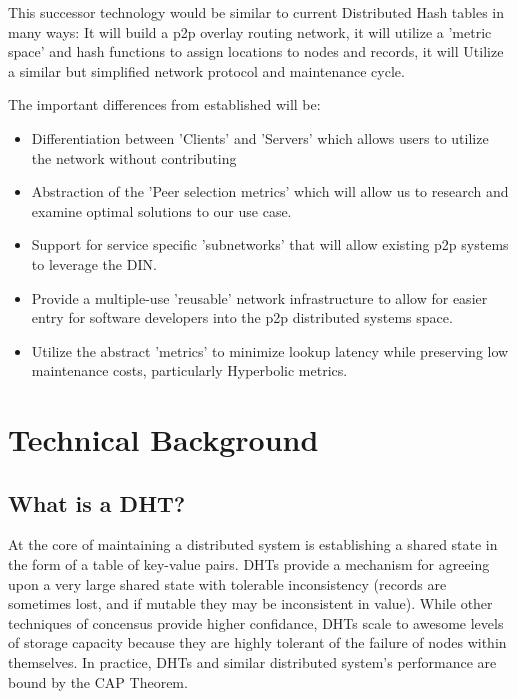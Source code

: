 This successor technology would be similar to current Distributed Hash tables in many ways: It will build a p2p overlay routing network, it will utilize a 'metric space' and hash functions to assign locations to nodes and records, it will Utilize a similar but simplified network protocol and maintenance cycle.

The important differences from established will be:

\begin{itemize}
\item Differentiation between 'Clients' and 'Servers' which allows users to utilize the network without contributing
\item Abstraction of the 'Peer selection metrics' which will allow us to research and examine optimal solutions to our use case.
\item Support for service specific 'subnetworks' that will allow existing p2p systems to leverage the DIN.
\item Provide a multiple-use 'reusable' network infrastructure to allow for easier entry for software developers into the p2p distributed systems space.
\item Utilize the abstract 'metrics' to minimize lookup latency while preserving low maintenance costs, particularly Hyperbolic metrics.
\end{itemize}









\chapter{Technical Background}
\section{What is a DHT?}
At the core of maintaining a distributed system is establishing a shared state in the form of a table of key-value pairs.
DHTs provide a mechanism for agreeing upon a very large shared state with tolerable inconsistency (records are sometimes lost, and if mutable they may be inconsistent in value).
While other techniques of concensus provide higher confidance, DHTs scale to awesome levels of storage capacity because they are highly tolerant of the failure of nodes within themselves.
In practice, DHTs and similar distributed system's performance are bound by the CAP Theorem\cite{brewer2010certain}.

